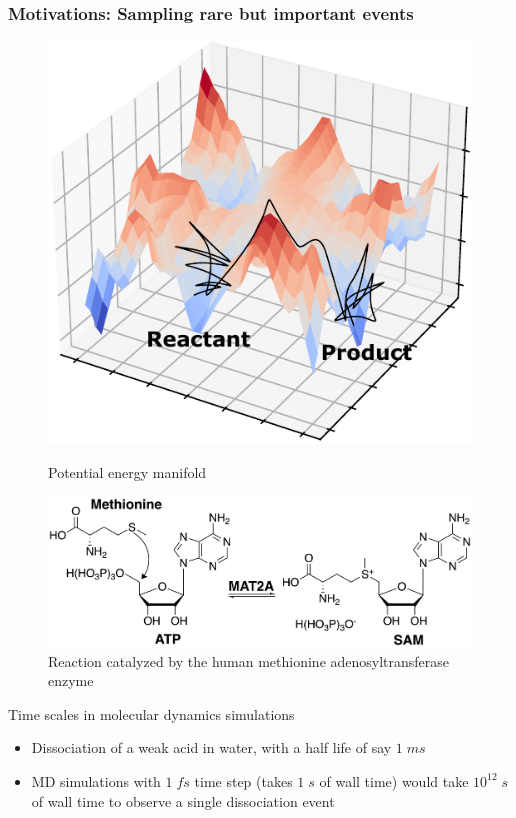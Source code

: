 \documentclass{beamer}
\begin{document}
\begin{frame}
\frametitle{Motivations: Sampling rare but important events}
\pause
\begin{figure}
\centering
\begin{minipage}[b]{0.45\linewidth}
\includegraphics[scale=0.5]{figures/pot-surf.pdf}
\caption{Potential energy manifold}
\end{minipage}
\begin{minipage}[b]{0.45\linewidth}
\includegraphics[scale=0.4]{figures/mat2a-reaction.png}
\caption{Reaction catalyzed by the human methionine adenosyltransferase enzyme}
\end{minipage}
\end{figure}
\pause
\begin{block}{Time scales in molecular dynamics simulations}
{
    \begin{itemize}
        \item Dissociation of a weak acid in water, with a half life of say $1\;ms$ 
        \item MD simulations with $1\;fs$ time step (takes $1\;s$ of wall time)
        would take $10^{12}\;s$ of wall time to observe a single dissociation event 
    \end{itemize}
}
\end{block}
\end{frame}
\end{document}
